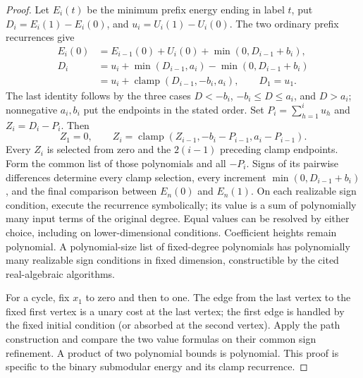 \begin{proof}
Let $E_i(t)$ be the minimum prefix energy ending in label $t$, put
$D_i=E_i(1)-E_i(0)$, and $u_i=U_i(1)-U_i(0)$. The two ordinary
prefix recurrences give
\begin{align*}
 E_i(0)&=E_{i-1}(0)+U_i(0)+\min(0,D_{i-1}+b_i),\\
 D_i&=u_i+\min(D_{i-1},a_i)-\min(0,D_{i-1}+b_i)\\
    &=u_i+\operatorname{clamp}(D_{i-1},-b_i,a_i),
 \qquad D_1=u_1.
\end{align*}
The last identity follows by the three cases $D<-b_i$,
$-b_i\le D\le a_i$, and $D>a_i$; nonnegative $a_i,b_i$ put the
endpoints in the stated order. Set $P_i=\sum_{h=1}^iu_h$ and
$Z_i=D_i-P_i$. Then
\begin{equation}
 Z_1=0,\qquad Z_i=\operatorname{clamp}
          (Z_{i-1},-b_i-P_{i-1},a_i-P_{i-1}).
 \label{s5:clamp-recurrence}
\end{equation}
Every $Z_i$ is selected from zero and the $2(i-1)$ preceding clamp
endpoints. Form the common list of those polynomials and all $-P_i$.
Signs of its pairwise differences determine every clamp selection,
every increment $\min(0,D_{i-1}+b_i)$, and the final comparison between
$E_n(0)$ and $E_n(1)$. On each realizable sign condition, execute the
recurrence symbolically; its value is a sum of polynomially many input
terms of the original degree. Equal values can be resolved by either
choice, including on lower-dimensional conditions. Coefficient heights
remain polynomial. A polynomial-size list of fixed-degree polynomials
has polynomially many realizable sign conditions in fixed dimension,
constructible by the cited real-algebraic algorithms.

For a cycle, fix $x_1$ to zero and then to one. The edge from the last
vertex to the fixed first vertex is a unary cost at the last vertex;
the first edge is handled by the fixed initial condition (or absorbed
at the second vertex). Apply the path construction and compare the two
value formulas on their common sign refinement. A product of two
polynomial bounds is polynomial. This proof is specific to the binary
submodular energy and its clamp recurrence.
\end{proof}

